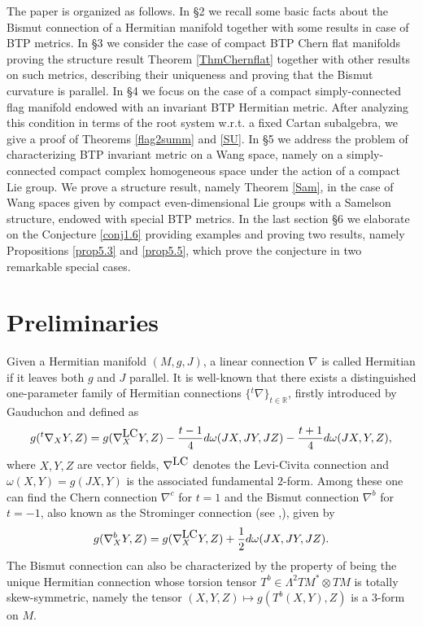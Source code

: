 \documentclass{amsart}
\numberwithin{equation}{section}
\theoremstyle{definition}
\renewcommand{\1}{\mathds{1}}
\renewcommand{\o}{\omega}
\renewcommand{\>}{\rightarrow}
\begin{document}
The paper is organized as follows. In \S 2 we recall some basic facts about the Bismut connection of a Hermitian manifold together with some results in case of {\rm BTP} metrics. In \S3 we consider the case of compact {\rm BTP} Chern flat manifolds proving the structure result Theorem \ref{ThmChernflat} together with other results on such metrics, describing their uniqueness and proving that the Bismut curvature is parallel. In \S 4 we focus on the case of a compact simply-connected flag manifold endowed with an invariant {\rm BTP} Hermitian metric. After analyzing this condition in terms of the root system w.r.t. a fixed Cartan subalgebra, we give a proof of Theorems \ref{flag2summ} and \ref{SU}. In \S5 we address the problem of characterizing {\rm BTP} invariant metric on a Wang space, namely on a simply-connected compact complex homogeneous space under the action of a compact Lie group. We prove a structure result, namely Theorem \ref{Sam}, in the case of Wang spaces given by compact even-dimensional Lie groups with a Samelson structure, endowed with special {\rm BTP} metrics. In the last section \S6 we elaborate on the Conjecture \ref{conj1.6} providing examples and proving two results, namely Propositions \ref{prop5.3} and \ref{prop5.5}, which prove the conjecture in two remarkable special cases.



\vspace{0.3cm}
\section{Preliminaries}
Given a Hermitian manifold $(M,g,J)$, a linear connection $\nabla$ is called Hermitian if it leaves both $g$ and $J$ parallel. It is well-known that there exists a distinguished one-parameter family of Hermitian connections $\{{}^t\nabla\}_{t\in\mathbb R}$, firstly introduced by Gauduchon \cite{Gaud} and defined as
$$g({}^t\nabla_XY,Z) = g(\nabla^{\mbox{\tiny LC}}_XY,Z) - \frac{t-1}4 d\o(JX,JY,JZ) - \frac{t+1}4 d\o(JX,Y,Z),$$
where $X,Y,Z$ are vector fields, $\nabla^{\mbox{\tiny LC}}$ denotes the Levi-Civita connection and $\o(X,Y)=g(JX,Y)$ is the associated fundamental $2$-form.
Among these one can find the Chern connection $\nabla^c$ for $t=1$ and the Bismut connection $\nabla^b$ for $t=-1$, also known as the Strominger connection (see \cite{Strominger},\cite{Bismut}), given by
\begin{equation}\label{def}
g(\nabla^b_XY,Z) = g(\nabla^{\mbox{\tiny LC}}_XY,Z) +\frac 12 d\o(JX,JY,JZ).
\end{equation}
The Bismut connection can also be characterized by the property of being the unique Hermitian connection whose torsion tensor $T^b\in\Lambda^2TM^*\otimes TM$ is totally skew-symmetric, namely the tensor $(X,Y,Z)\mapsto g(T^b(X,Y),Z)$ is a $3$-form on $M$.
\end{document}
